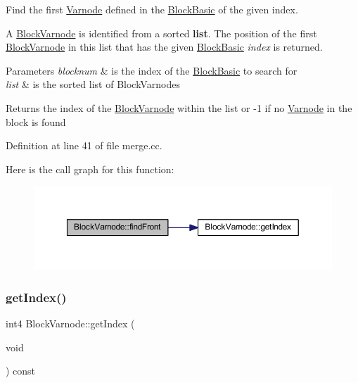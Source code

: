 Find the first \mbox{\hyperlink{class_varnode}{Varnode}} defined in the \mbox{\hyperlink{class_block_basic}{Block\+Basic}} of the given index. 

A \mbox{\hyperlink{class_block_varnode}{Block\+Varnode}} is identified from a sorted {\bfseries{list}}. The position of the first \mbox{\hyperlink{class_block_varnode}{Block\+Varnode}} in this list that has the given \mbox{\hyperlink{class_block_basic}{Block\+Basic}} {\itshape index} is returned. 
\begin{DoxyParams}{Parameters}
{\em blocknum} & is the index of the \mbox{\hyperlink{class_block_basic}{Block\+Basic}} to search for \\
\hline
{\em list} & is the sorted list of Block\+Varnodes \\
\hline
\end{DoxyParams}
\begin{DoxyReturn}{Returns}
the index of the \mbox{\hyperlink{class_block_varnode}{Block\+Varnode}} within the list or -\/1 if no \mbox{\hyperlink{class_varnode}{Varnode}} in the block is found 
\end{DoxyReturn}


Definition at line 41 of file merge.\+cc.

Here is the call graph for this function\+:
\nopagebreak
\begin{figure}[H]
\begin{center}
\leavevmode
\includegraphics[width=350pt]{class_block_varnode_a944320adf17c44b207d095cca216ee63_cgraph}
\end{center}
\end{figure}
\mbox{\label{class_block_varnode_a51eeb35ed7db7fefa0cfd52ec9b719ac}} 
\subsubsection{\texorpdfstring{getIndex()}{getIndex()}}
{\footnotesize\ttfamily int4 Block\+Varnode\+::get\+Index (\begin{DoxyParamCaption}\item[{void}]{ }\end{DoxyParamCaption}) const\hspace{0.3cm}{\ttfamily [inline]}}



